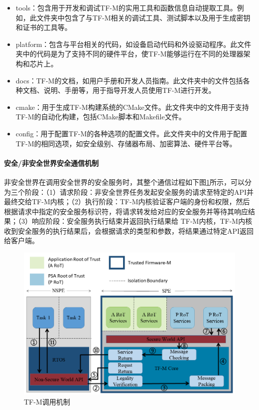 \documentclass[UTF8,12pt,a4paper]{ctexart}
\numberwithin{figure}{section}
\begin{document}
\begin{itemize}
    \item tools：包含用于开发和调试TF-M的实用工具和函数信息自动提取工具。例如，此文件夹中包含了与TF-M相关的调试工具、测试脚本以及用于生成密钥和证书的工具等。
    \item platform：包含与平台相关的代码，如设备启动代码和外设驱动程序。此文件夹中的代码是为了支持不同的硬件平台，使TF-M能够运行在不同的处理器架构和芯片上。
    \item docs：TF-M的文档，如用户手册和开发人员指南。此文件夹中的文件包括各种文档、说明、手册等，用于指导开发人员使用TF-M进行开发。
    \item cmake：用于生成TF-M构建系统的CMake文件。此文件夹中的文件用于支持TF-M的自动化构建，包括CMake脚本和Makefile文件。
    \item config：用于配置TF-M的各种选项的配置文件。此文件夹中的文件用于配置TF-M的相同选项，如安全级别、存储器布局、加密算法、硬件平台等。
\end{itemize}

\paragraph{安全/非安全世界安全通信机制}
非安全世界在调用安全世界的安全服务时，其整个通信过程如下图\ref{TF-M Secure communication processes}所示，可以分为三个阶段：（1）请求阶段：非安全世界任务发起安全服务的请求至特定的API并最终交给TF-M内核；（2）执行阶段：TF-M内核验证客户端的身份和权限，然后根据请求中指定的安全服务标识符，将请求转发给对应的安全服务并等待其响应结果；（3）响应阶段：安全服务执行结束并返回执行结果给 TF-M内核，TF-M内核收到安全服务的执行结果后，会根据请求的类型和参数，将结果通过特定API返回给客户端。
\begin{figure}
    \centering
    \includegraphics[scale=0.38]{graph/TF-M Secure communication process.png}
    \caption{TF-M调用机制}
    \label{TF-M Secure communication processes}
\end{figure}
\end{document}
